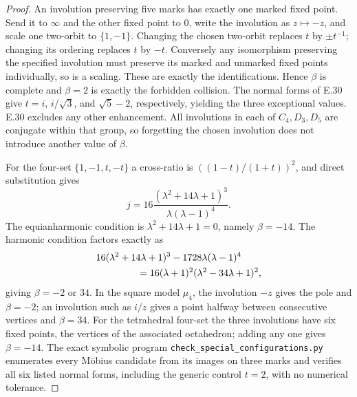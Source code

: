 \begin{proof}
An involution preserving five marks has exactly one marked fixed
point.  Send it to $\infty$ and the other fixed point to $0$,
write the involution as $z\mapsto-z$, and scale one two-orbit to
$\{1,-1\}$.  Changing the chosen two-orbit replaces $t$ by
$\pm t^{-1}$; changing its ordering replaces $t$ by $-t$.
Conversely any isomorphism preserving the specified involution
must preserve its marked and unmarked fixed points individually,
so is a scaling.  These are exactly the identifications.  Hence
$\beta$ is complete and $\beta=2$ is exactly the forbidden collision.
The normal forms of E.30 give $t=i$, $i/\sqrt3$, and $\sqrt5-2$,
respectively, yielding the three exceptional values.  E.30 excludes
any other enhancement.  All involutions in each of $C_4,D_3,D_5$
are conjugate within that group, so forgetting the chosen involution
does not introduce another value of $\beta$.

For the four-set $\{1,-1,t,-t\}$ a cross-ratio is
$((1-t)/(1+t))^2$, and direct substitution gives
\[
 j=16\frac{(\lambda^2+14\lambda+1)^3}
 {\lambda(\lambda-1)^4}.
\]
The equianharmonic condition is $\lambda^2+14\lambda+1=0$,
namely $\beta=-14$.  The harmonic condition factors exactly as
\begin{align*}
 &16(\lambda^2+14\lambda+1)^3
 -1728\lambda(\lambda-1)^4\\
 &\hspace{15mm}=16(\lambda+1)^2(\lambda^2-34\lambda+1)^2,
\end{align*}
giving $\beta=-2$ or $34$.  In the square model $\mu_4$, the
involution $-z$ gives the pole and $\beta=-2$; an involution such
as $i/z$ gives a point halfway between consecutive vertices and
$\beta=34$.  For the tetrahedral four-set the three involutions
have six fixed points, the vertices of the associated octahedron;
adding any one gives $\beta=-14$.
The exact symbolic program \texttt{check\_special\_configurations.py}
enumerates every M\"obius candidate from its images on three marks
and verifies all six listed normal forms, including the generic
control $t=2$, with no numerical tolerance.
\end{proof}

